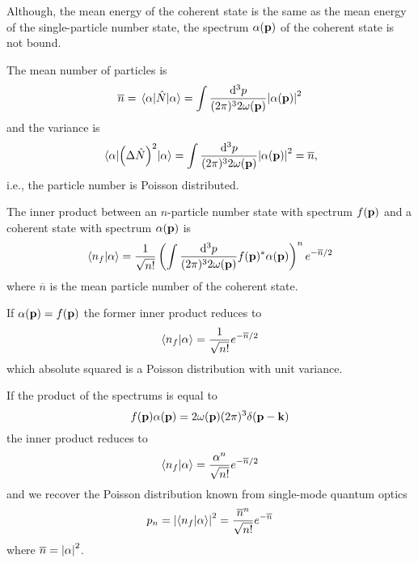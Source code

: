 Although, the mean energy of the coherent state is the same as the mean energy of the single-particle number state, the spectrum $\alpha(\vb{p})$ of the coherent state is not bound.
\begin{lemma}\label{thm:coherent_state_number_observable}
	The mean number of particles is
	\begin{equation}
		\overline{n}
		=
		\expval{\hat{N}}{\alpha}
		=
		\int\frac{\dd[3]{p}}{(2\pi)^32\omega(\vb{p})}
		\abs{\alpha(\vb{p})}^2
	\end{equation}
	and the variance is
	\begin{equation}
		\expval{\left(\Delta\hat{N}\right)^2}{\alpha}
		=
		\int\frac{\dd[3]{p}}{(2\pi)^32\omega(\vb{p})}
		\abs{\alpha(\vb{p})}^2
		=
		\overline{n}
		,
	\end{equation}
	i.e., the particle number is Poisson distributed.
\end{lemma}
\begin{lemma}\label{thm:coherent_state_number_state_inner_product}
	The inner product between an $n$-particle number state with spectrum $f(\vb{p})$ and a coherent state with spectrum $\alpha(\vb{p})$ is
	\begin{equation}
		\braket{n_f}{\alpha}
		=
		\frac{1}{\sqrt{n!}}
		\left(
			\int\frac{\dd[3]{p}}{(2\pi)^32\omega(\vb{p})}
			f(\vb{p})^*
			\alpha(\vb{p})
		\right)^n
		e^{-\overline{n}/2}
	\end{equation}
	where $\overline{n}$ is the mean particle number of the coherent state.
\end{lemma}
\begin{corollary}
	If $\alpha(\vb{p})=f(\vb{p})$ the former inner product reduces to
	\begin{equation}
		\braket{n_f}{\alpha}
		=
		\frac{1}{\sqrt{n!}}
		e^{-\overline{n}/2}
	\end{equation}
	which absolute squared is a Poisson distribution with unit variance.
\end{corollary}
\begin{corollary}
	If the product of the spectrums is equal to
	\begin{equation}
		f(\vb{p})
		\alpha(\vb{p})
		=
		2\omega(\vb{p})
		(2\pi)^3
		\delta(\vb{p}-\vb{k})
	\end{equation}
	the inner product reduces to
	\begin{equation}
		\braket{n_f}{\alpha}
		=
		\frac{\alpha^n}{\sqrt{n!}}
		e^{-\overline{n}/2}
	\end{equation}
	and we recover the Poisson distribution known from single-mode quantum optics
	\begin{equation}
		p_n
		=
		\abs{\braket{n_f}{\alpha}}^2
		=
		\frac{\overline{n}^n}{\sqrt{n!}}
		e^{-\overline{n}}
	\end{equation}
	where $\overline{n}=\abs{\alpha}^2$.
\end{corollary}
